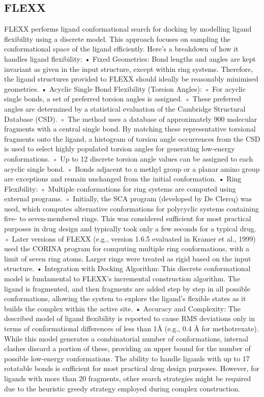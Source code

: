 \documentclass[11pt]{article}
\begin{document}
\subsection*{FLEXX}
FLEXX performs ligand conformational search for docking by modelling ligand flexibility using a discrete model. This approach focuses on sampling the conformational space of the ligand efficiently.
Here's a breakdown of how it handles ligand flexibility:
• Fixed Geometries: Bond lengths and angles are kept invariant as given in the input structure, except within ring systems. Therefore, the ligand structures provided to FLEXX should ideally be reasonably minimised geometries.
• Acyclic Single Bond Flexibility (Torsion Angles):
    ◦ For acyclic single bonds, a set of preferred torsion angles is assigned.
    ◦ These preferred angles are determined by a statistical evaluation of the Cambridge Structural Database (CSD).
    ◦ The method uses a database of approximately 900 molecular fragments with a central single bond. By matching these representative torsional fragments onto the ligand, a histogram of torsion angle occurrences from the CSD is used to select highly populated torsion angles for generating low-energy conformations.
    ◦ Up to 12 discrete torsion angle values can be assigned to each acyclic single bond.
    ◦ Bonds adjacent to a methyl group or a planar amino group are exceptions and remain unchanged from the initial conformation.
• Ring Flexibility:
    ◦ Multiple conformations for ring systems are computed using external programs.
    ◦ Initially, the SCA program (developed by De Clercq) was used, which computes alternative conformations for polycyclic systems containing five- to seven-membered rings. This was considered sufficient for most practical purposes in drug design and typically took only a few seconds for a typical drug.
    ◦ Later versions of FLEXX (e.g., version 1.6.5 evaluated in Kramer et al., 1999) used the CORINA program for computing multiple ring conformations, with a limit of seven ring atoms. Larger rings were treated as rigid based on the input structure.
• Integration with Docking Algorithm: This discrete conformational model is fundamental to FLEXX's incremental construction algorithm. The ligand is fragmented, and then fragments are added step by step in all possible conformations, allowing the system to explore the ligand's flexible states as it builds the complex within the active site.
• Accuracy and Complexity: The described model of ligand flexibility is reported to cause RMS deviations only in terms of conformational differences of less than 1{\AA} (e.g., 0.4 {\AA} for methotrexate). While this model generates a combinatorial number of conformations, internal clashes discard a portion of these, providing an upper bound for the number of possible low-energy conformations. The ability to handle ligands with up to 17 rotatable bonds is sufficient for most practical drug design purposes. However, for ligands with more than 20 fragments, other search strategies might be required due to the heuristic greedy strategy employed during complex construction.
\end{document}
